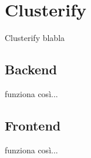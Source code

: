 \chapter{Clusterify}
Clusterify blabla

\section{Backend}
	funziona così...

\section{Frontend}
	funziona così...
